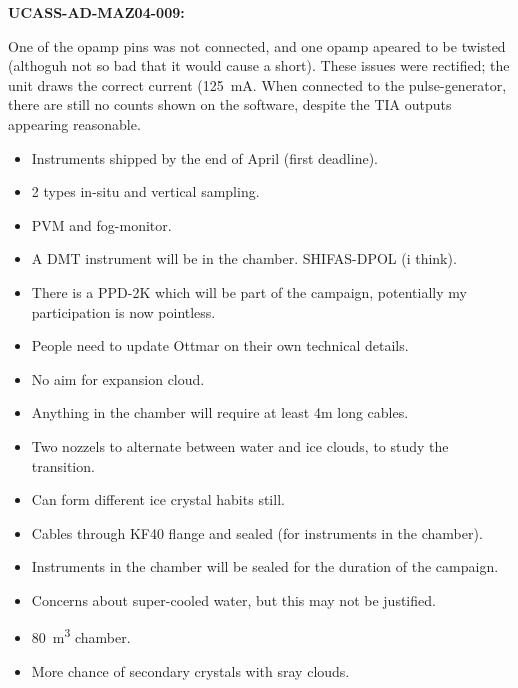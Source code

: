 \textbf{UCASS-AD-MAZ04-009:}

One of the opamp pins was not connected, and one opamp apeared to be twisted (althoguh not so bad that it would cause a short). These issues were rectified; the unit draws the correct current (\SI{125}{\milli\ampere}. When connected to the pulse-generator, there are still no counts shown on the software, despite the TIA outputs appearing reasonable.




\begin{itemize}
\item Instruments shipped by the end of April (first deadline).
\item 2 types in-situ and vertical sampling.
\item PVM and fog-monitor.
\item A DMT instrument will be in the chamber. SHIFAS-DPOL (i think).
\item There is a PPD-2K which will be part of the campaign, potentially my participation is now pointless.
\item People need to update Ottmar on their own technical details.
\item No aim for expansion cloud.
\item Anything in the chamber will require at least 4m long cables.
\item Two nozzels to alternate between water and ice clouds, to study the transition.
\item Can form different ice crystal habits still.
\item Cables through KF40 flange and sealed (for instruments in the chamber).
\item Instruments in the chamber will be sealed for the duration of the campaign.
\item Concerns about super-cooled water, but this may not be justified.
\item \SI{80}{\cubic\metre} chamber.
\item More chance of secondary crystals with sray clouds.
\end{itemize}



